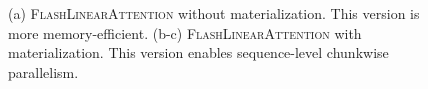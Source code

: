 \begin{figure}[t]
{\begin{tikzpicture}[%
            every path/.style={thick,%
            },
                           dcs/.style = {double copy shadow, shadow xshift=4pt, shadow yshift=-4pt}
          ]
%
%
%
%
%
%

%
        \end{tikzpicture}   
}
        \vspace{-2mm}
        \caption{(a) \textsc{FlashLinearAttention} without materialization. This version is more memory-efficient. (b-c) \textsc{FlashLinearAttention} with materialization. This version enables sequence-level chunkwise parallelism.} \label{fig:chunk}
              
    \end{figure}